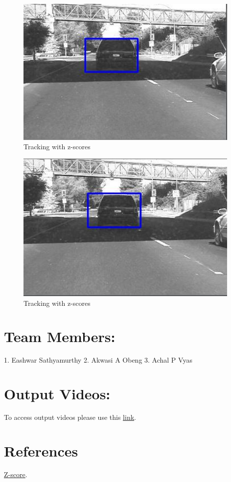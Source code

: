 \documentclass[12pt]{article}
\begin{document}
\begin{figure}[h]
    \centering
    \includegraphics[width=11cm]{trackcar4}
    \caption{Tracking with z-scores}
    \label{fig:Tracking with z-scores}
\end{figure}
\begin{figure}[h]
    \centering
    \includegraphics[width=11cm]{trackcar5}
    \caption{Tracking with z-scores}
    \label{fig:Tracking with z-scores}
\end{figure}
\newpage
\section{Team Members:}
1. Eashwar Sathyamurthy
2. Akwasi A Obeng
3. Achal P Vyas
\section{Output Videos:}
To access output videos please use this \href{https://drive.google.com/drive/folders/1nbAUx-p-eyOWts9neJgAPA8YATY4ekmI?usp=sharing}{\underline{link}}.

\section{References}
\href{https://www.statisticshowto.com/probability-and-statistics/z-score/}{\underline{Z-score}}.
\end{document}
